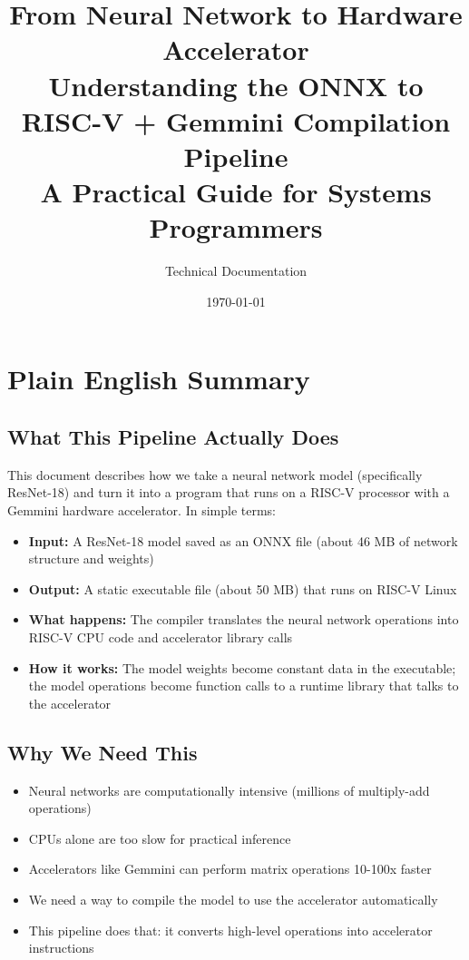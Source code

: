 \documentclass[12pt,a4paper]{article}
\title{%
  {\Large\bfseries From Neural Network to Hardware Accelerator}\\[6pt]
  {\large Understanding the ONNX to RISC-V + Gemmini Compilation Pipeline}\\[4pt]
  {\normalsize A Practical Guide for Systems Programmers}
}
\author{Technical Documentation}
\date{\today}
\begin{document}
\maketitle

\section*{Plain English Summary}

\subsection*{What This Pipeline Actually Does}

This document describes how we take a neural network model (specifically ResNet-18) and turn it into a program that runs on a RISC-V processor with a Gemmini hardware accelerator. In simple terms:

\begin{itemize}[leftmargin=*]
  \item \textbf{Input:} A ResNet-18 model saved as an ONNX file (about 46 MB of network structure and weights)
  \item \textbf{Output:} A static executable file (about 50 MB) that runs on RISC-V Linux
  \item \textbf{What happens:} The compiler translates the neural network operations into RISC-V CPU code and accelerator library calls
  \item \textbf{How it works:} The model weights become constant data in the executable; the model operations become function calls to a runtime library that talks to the accelerator
\end{itemize}

\subsection*{Why We Need This}

\begin{itemize}[leftmargin=*]
  \item Neural networks are computationally intensive (millions of multiply-add operations)
  \item CPUs alone are too slow for practical inference
  \item Accelerators like Gemmini can perform matrix operations 10-100x faster
  \item We need a way to compile the model to use the accelerator automatically
  \item This pipeline does that: it converts high-level operations into accelerator instructions
\end{itemize}
\end{document}
